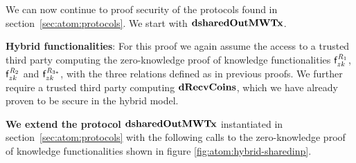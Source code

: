 We can now continue to proof security of the protocols found in section~\ref{sec:atom:protocols}.
We start with $\mathbf{dsharedOutMWTx}$.

\textbf{Hybrid functionalities}: For this proof we again assume the access to a trusted third party computing the zero-knowledge proof of knowledge functionalities $\mathsf{f}^{\mathit{R}_1}_{zk}$, $\mathsf{f}^{\mathit{R}_2}_{zk}$ and $\mathsf{f}^{\mathit{R}_{3*}}_{zk}$, with the three relations defined as in previous proofs.
We further require a trusted third party computing $\mathbf{dRecvCoins}$, which we have already proven to be secure in the hybrid model.

\textbf{We extend the protocol $\mathbf{dsharedOutMWTx}$} instantiated in section~\ref{sec:atom:protocols} with the following calls to the zero-knowledge proof of knowledge functionalities shown in figure \ref{fig:atom:hybrid-sharedinp}.

